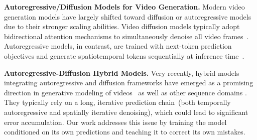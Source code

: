 \documentclass{article}
\begin{document}
\noindent\textbf{Autoregressive/Diffusion Models for Video Generation.}
Modern video generation models have largely shifted toward diffusion or autoregressive models due to their stronger scaling abilities. Video diffusion models typically adopt bidirectional attention mechanisms to simultaneously denoise all video frames~\cite{ho2022video,blattmann2023align,Ho2022ImagenVH,videoworldsimulators2024,polyak2024movie,yang2025cogvideox,hacohen2024ltx,kong2024hunyuanvideo,blattmann2023stable,villegas2023phenaki,deng2024nova,gupta2024photorealistic,wang2025wan}. Autoregressive models, in contrast, are trained with next-token prediction objectives and generate spatiotemporal tokens sequentially at inference time~\cite{weissenborn2020scaling, kondratyuk2024videopoet,yan2021videogpt,wang2024loong,Bruce2024GenieGI,ren2025next}.

\noindent\textbf{Autoregressive-Diffusion Hybrid Models.}
Very recently, hybrid models integrating autoregressive and diffusion frameworks have emerged as a promising direction in generative modeling of videos~\cite{weng2024art,liu2024redefining,chen2024diffusion,guo2025long,yin2025causvid,hu2024acdit,jin2024pyramidal,gu2025long,gao2024ca2,li2025arlon,liu2024mardini,zhang2025generative,zhang2025test} as well as other sequence domains \cite{li2024autoregressive,wu2023ar,deng2024causal,arriola2025block,liu2024autoregressive,zhou2025transfusion,mo2025xfusionintroducingnewmodality}.
They typically rely on a long, iterative prediction chain~(both temporally autoregressive and spatially iterative denoising), which could lead to significant error accumulation.
Our work addresses this issue
by training the model conditioned on its own predictions and teaching it to correct its own mistakes.
\end{document}

